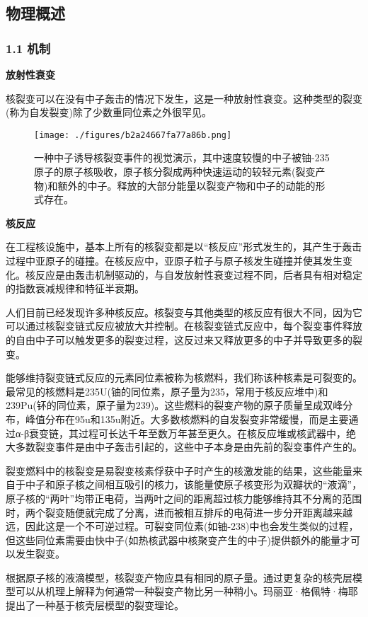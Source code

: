 \subsection{ 物理概述}
\subsubsection{1.1 机制}

\textbf{放射性衰变}

核裂变可以在没有中子轰击的情况下发生，这是一种放射性衰变。这种类型的裂变(称为自发裂变)除了少数重同位素之外很罕见。
\begin{figure}[ht]
\centering
\texttt{[image: ./figures/b2a24667fa77a86b.png]}
\caption{一种中子诱导核裂变事件的视觉演示，其中速度较慢的中子被铀-235原子的原子核吸收，原子核分裂成两种快速运动的较轻元素(裂变产物)和额外的中子。释放的大部分能量以裂变产物和中子的动能的形式存在。} \label{fig_HLB_1}
\end{figure}

\textbf{核反应}

在工程核设施中，基本上所有的核裂变都是以“核反应”形式发生的，其产生于轰击过程中亚原子的碰撞。在核反应中，亚原子粒子与原子核发生碰撞并使其发生变化。核反应是由轰击机制驱动的，与自发放射性衰变过程不同，后者具有相对稳定的指数衰减规律和特征半衰期。

人们目前已经发现许多种核反应。核裂变与其他类型的核反应有很大不同，因为它可以通过核裂变链式反应被放大并控制。在核裂变链式反应中，每个裂变事件释放的自由中子可以触发更多的裂变过程，这反过来又释放更多的中子并导致更多的裂变。

能够维持裂变链式反应的元素同位素被称为核燃料，我们称该种核素是可裂变的。最常见的核燃料是235U(铀的同位素，原子量为235，常用于核反应堆中)和239Pu(钚的同位素，原子量为239)。这些燃料的裂变产物的原子质量呈成双峰分布，峰值分布在95u和135u附近。大多数核燃料的自发裂变非常缓慢，而是主要通过α-β衰变链，其过程可长达千年至数万年甚至更久。在核反应堆或核武器中，绝大多数裂变事件是由中子轰击引起的，这些中子本身是由先前的裂变事件产生的。

裂变燃料中的核裂变是易裂变核素俘获中子时产生的核激发能的结果，这些能量来自于中子和原子核之间相互吸引的核力，该能量使原子核变形为双瓣状的“液滴”，原子核的“两叶”均带正电荷，当两叶之间的距离超过核力能够维持其不分离的范围时，两个裂变随便就完成了分离，进而被相互排斥的电荷进一步分开距离越来越远，因此这是一个不可逆过程。可裂变同位素(如铀-238)中也会发生类似的过程，但这些同位素需要由快中子(如热核武器中核聚变产生的中子)提供额外的能量才可以发生裂变。

根据原子核的液滴模型，核裂变产物应具有相同的原子量。通过更复杂的核壳层模型可以从机理上解释为何通常一种裂变产物比另一种稍小。玛丽亚·格佩特·梅耶提出了一种基于核壳层模型的裂变理论。

